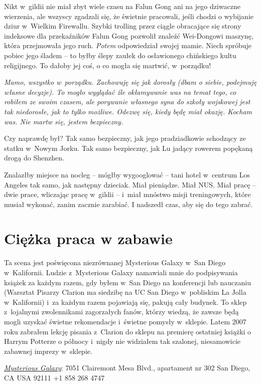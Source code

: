 \documentclass[oneside,polish,11pt,rmheadings]{mwbk}
\begin{document}
Nikt w~gildii nie miał zbyt wiele czasu na Falun Gong ani na jego dziwaczne wierzenia, ale wszyscy zgadzali się, że świetnie pracowali, jeśli chodzi o wybijanie dziur w~Wielkim Firewallu. Szybki trolling przez ciągle obracające się strony indeksowe dla przekaźników Falun Gong pozwolił znaleźć Wei-Dongowi maszynę, która przejmowała jego ruch. \textit{Potem }odpowiedział swojej mamie. Niech spróbuje pobiec jego śladem -- to byłby ślepy zaułek do osławionego chińskiego kultu religijnego. To dałoby jej coś, o co mogła się martwić, w~porządku! 


\textit{Mamo, wszystko w~porządku. Zachowuję się jak dorosły (dbam o siebie, podejmuję własne decyzje). To mogło wyglądać źle okłamywanie was na temat tego, co robiłem ze swoim czasem, ale porywanie własnego syna do szkoły wojskowej jest tak niedorosłe, jak to tylko możliwe. Odezwę się, kiedy będę miał okazję. Kocham was. Nie martw się, jestem bezpieczny.}


Czy naprawdę był? Tak samo bezpieczny, jak jego pradziadkowie schodzący ze statku w~Nowym Jorku. Tak samo bezpieczny, jak Lu jadący rowerem popękaną drogą do Shenzhen. 


Znalazłby miejsce na nocleg -- mógłby wygooglować -- tani hotel w~centrum Los Angeles tak samo, jak następny dzieciak. Miał pieniądze. Miał NUS. Miał pracę -- dwie prace, wliczając pracę w~gildii -- i~miał mnóstwo misji treningowych, które musiał wykonać, zanim zacznie zarabiać. I nadszedł czas, aby się do tego zabrać. 


\chapter{Ciężka praca w zabawie }



Ta scena jest poświęcona niezrównanej Mysterious Galaxy w~San Diego w~Kalifornii. Ludzie z~Mysterious Galaxy namawiali mnie do podpisywania książek za każdym razem, gdy byłem w~San Diego na konferencji lub nauczaniu (Warsztat Pisarzy Clarion ma siedzibę na UC San Diego w~pobliskim La Jolla w~Kalifornii) i~za każdym razem pojawiają się, pakują cały budynek. To sklep z~lojalnymi zwolennikami zagorzałych fanów, którzy wiedzą, że zawsze będą mogli uzyskać świetne rekomendacje i~świetne pomysły w~sklepie. Latem 2007 roku zabrałem lekcję pisania z~Clarion do sklepu na premierę ostatniej książki o Harrym Potterze o północy i~nigdy nie widziałem tak szalonej, niesamowicie zabawnej imprezy w~sklepie. 


\href{https://www.mystgalaxy.com/book/9780765322166}{\textit{Mysterious Galaxy}}: 7051 Clairemont Mesa Blvd., apartament nr 302 San Diego, CA USA 92111 +1 858 268 4747 
\end{document}
